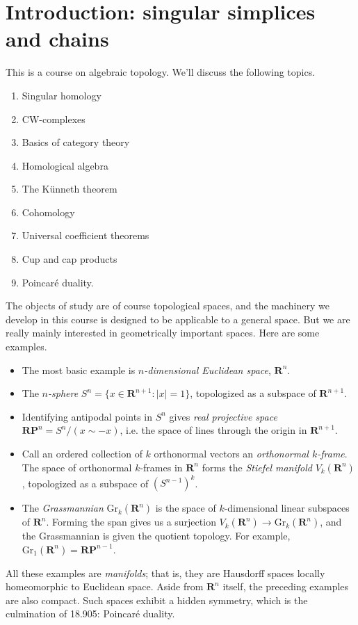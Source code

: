 
\section{Introduction: singular simplices and chains}\label{905}
This is a course on algebraic topology. 
We'll discuss the following topics. 
\begin{enumerate}
    \item Singular homology
    \item CW-complexes
    \item Basics of category theory
    \item Homological algebra
    \item The K\"{u}nneth theorem
    \item Cohomology
    \item Universal coefficient theorems
    \item Cup and cap products
    \item Poincar\'{e} duality.
\end{enumerate}
The objects of study are of course topological spaces, and the machinery
we develop in this course is designed to be applicable to a general space. 
But we are really mainly interested in geometrically important spaces. 
Here are some examples. 
\begin{itemize}
    \item The most basic example is \emph{$n$-dimensional Euclidean space}, $\mathbf{R}^n$.
    \item The \emph{$n$-sphere} $S^n=\{x\in \mathbf{R}^{n+1}:|x|=1\}$, topologized as a subspace of $\mathbf{R}^{n+1}$.
    \item Identifying antipodal points in $S^n$ gives \emph{real projective space} $\mathbf{RP}^n=S^n / (x\sim -x)$, i.e. the space of lines through the origin in $\mathbf{R}^{n+1}$.
    \item Call an ordered collection of $k$ orthonormal vectors an \emph{orthonormal $k$-frame}. The space of orthonormal $k$-frames in $\mathbf{R}^n$ forms the \emph{Stiefel manifold} $V_k(\mathbf{R}^n)$, topologized as a subspace of $(S^{n-1})^k$.
   \item The \emph{Grassmannian}  $\mathrm{Gr}_k(\mathbf{R}^n)$ is the space of
$k$-dimensional linear subspaces of $\mathbf{R}^n$. Forming the span gives us
a surjection $V_k(\mathbf{R}^n)\to\mathrm{Gr}_k(\mathbf{R}^n)$, and the
Grassmannian is given the quotient topology. 
For example, $\mathrm{Gr}_1(\mathbf{R}^n) = \mathbf{RP}^{n-1}$.
\end{itemize}
All these examples are \emph{manifolds}; that is, they are Hausdorff spaces locally homeomorphic to Euclidean space. Aside from $\mathbf{R}^n$ itself, the preceding examples are also compact. Such spaces exhibit a hidden symmetry, which is the culmination of 18.905: Poincar\'{e} duality.

